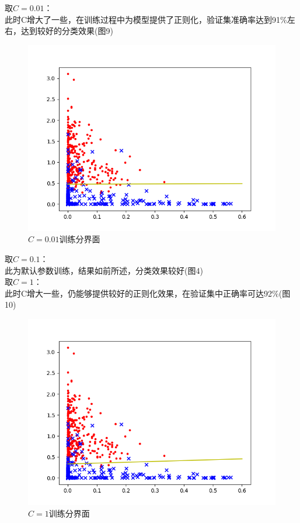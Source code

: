 \documentclass[a4paper]{article}
\begin{document}
取$ C = 0.01 $：\\
此时C增大了一些，在训练过程中为模型提供了正则化，验证集准确率达到91\%左右，达到较好的分类效果(图9)\\
\begin{figure}
    \centering
    \includegraphics[width=12cm]{Fig_9.png}
    \caption{$ C = 0.01 $训练分界面}
\end{figure}

取$ C = 0.1 $：\\
此为默认参数训练，结果如前所述，分类效果较好(图4)\\

取$ C = 1 $：\\
此时C增大一些，仍能够提供较好的正则化效果，在验证集中正确率可达92\%(图10)\\
\begin{figure}
    \centering
    \includegraphics[width=12cm]{Fig_10.png}
    \caption{$ C = 1 $训练分界面}
\end{figure}
\end{document}

